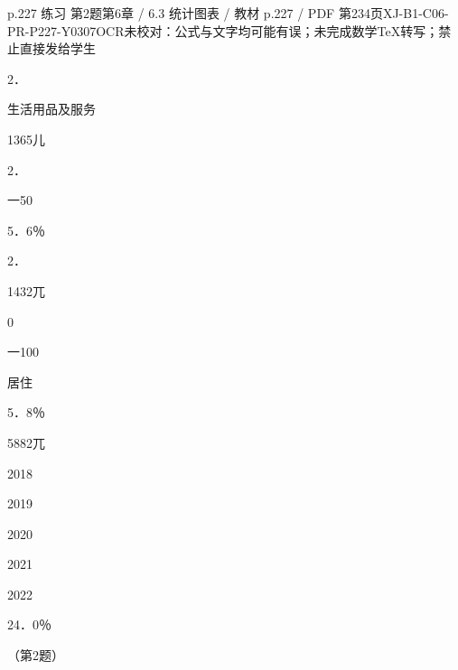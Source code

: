 \begin{bankitem}{p.227 练习 第2题}{第6章 / 6.3 统计图表 / 教材 p.227 / PDF 第234页}{XJ-B1-C06-PR-P227-Y0307}{OCR未校对：公式与文字均可能有误；未完成数学TeX转写；禁止直接发给学生}
\begin{ocrdraft}
2．
\par
生活用品及服务
\par
1365儿
\par
2．
\par
一50
\par
5．6％
\par
2．
\par
1432兀
\par
0
\par
一100
\par
居住
\par
5．8％
\par
5882兀
\par
2018
\par
2019
\par
2020
\par
2021
\par
2022
\par
24．0％
\par
（第2题）
\end{ocrdraft}
\end{bankitem}
